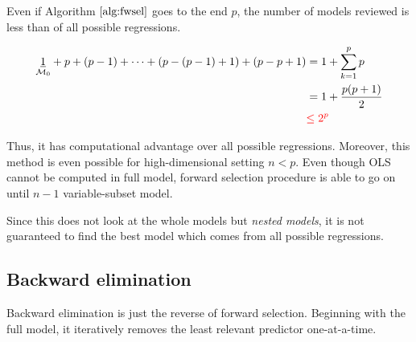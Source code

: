 \documentclass[]{book}
\theoremstyle{definition}
\theoremstyle{definition}
\theoremstyle{definition}
\theoremstyle{remark}
\begin{document}
Even if Algorithm \(\ref{alg:fwsel}\) goes to the end \(p\), the number of models reviewed is less than of all possible regressions.

\begin{equation*}
  \begin{split}
    \underset{\mathcal{M}_0}{\underline{1}} + p + (p - 1) + \cdots + (p - (p - 1) + 1) + (p - p + 1) & = 1 + \sum_{k = 1}^p p \\
    & = 1 + \frac{p (p + 1)}{2} \\
    & \color{red}{\le 2^p}
  \end{split}
\end{equation*}

Thus, it has computational advantage over all possible regressions. Moreover, this method is even possible for high-dimensional setting \(n < p\). Even though OLS cannot be computed in full model, forward selection procedure is able to go on until \(n - 1\) variable-subset model.

Since this does not look at the whole models but \emph{nested models}, it is not guaranteed to find the best model which comes from all possible regressions.

\hypertarget{backward-elimination}{%
\subsection{Backward elimination}\label{backward-elimination}}

Backward elimination is just the reverse of forward selection. Beginning with the full model, it iteratively removes the least relevant predictor one-at-a-time.
\end{document}
